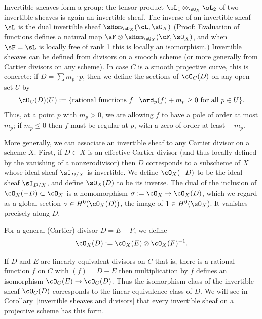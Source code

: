 Invertible sheaves form a group: the tensor product
$\sL_1\otimes_{\sO_X}\sL_2$ of two invertible sheaves is  again an invertible sheaf.
The
inverse of an invertible sheaf $\sL$ is  the dual invertible sheaf $\sHom_{\sO_X}(\cL,\sO_X)$
(Proof: Evaluation of functions defines a natural map $\sF \otimes  \sHom_{\sO_X}(\cF,\sO_X)$,
and when $\sF = \sL$ is locally free of rank 1 this is locally an isomorphism.) 
Invertible sheaves can be defined from divisors on a smooth scheme (or more generally from Cartier divisors on any scheme). In case $C$ is a smooth projective curve, this is concrete: if $D = \sum m_p \cdot p$, then we define the sections of $\cO_C(D)$ on any open set $U$ by
$$
\cO_C(D)(U) := \{ \text{rational functions } f \mid \ord_p(f) + m_p \geq 0 \text{ for all } p \in U \}.
$$
Thus, at a point $p$ with $m_p > 0$, we are allowing $f$ to have a pole of order at most $m_p$; if $m_p \leq 0$ then $f$ must be regular at $p$, with a zero of order at least~$-m_p$.

More generally, we can associate an invertible sheaf to any 
Cartier divisor
%
on a scheme $X$.
First, if
 $D\subset X$ is an effective Cartier divisor (and thus locally defined by the vanishing of a nonzerodivisor) then
$D$ corresponds to a subscheme of $X$ whose ideal sheaf $\sI_{D/X}$
is invertible. We define $\cO_X(-D)$ to be the ideal sheaf $\sI_{D/X}$, and define $\sO_{X}(D)$ to be 
its inverse. The dual of the inclusion of
$\cO_X(-D) \subset \cO_X$ is a homomorphism $\sigma := \cO_X \to
\cO_X(D)$, 
which
we regard as a global section $\sigma \in H^0(\cO_X(D))$, the image of $1\in H^0(\sO_X)$. It
vanishes precisely along $D$. 

For a general (Cartier) divisor $D = E - F$, we define
$$
\cO_X(D) := \cO_X(E) \otimes \cO_X(F)^{-1}.
$$

If $D$ and $E$ are linearly equivalent divisors on $C$ \emdash that is, 
there is a rational function $f$ on $C$ with $(f) = D - E$ \emdash
then multiplication by $f$ defines an isomorphism 
$\cO_C(E) \to \cO_C(D)$. 
Thus the isomorphism class of the invertible sheaf $\cO_C(D)$
corresponds to the linear equivalence class of $D$. We will see 
in Corollary~\ref{invertible sheaves and divisors} 
that every invertible sheaf on a projective scheme has this form.

